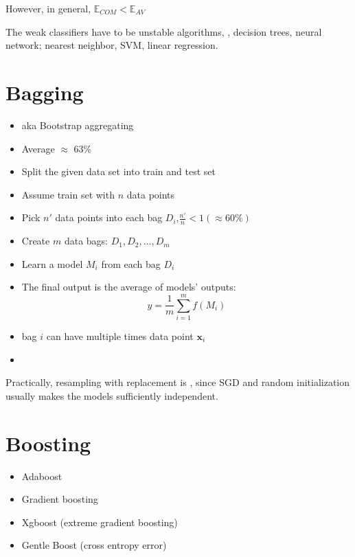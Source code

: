 However, in general, $\mathbb{E}_{COM} < \mathbb{E}_{AV}$

\note The weak classifiers have to be unstable algorithms, \ie, decision trees, neural network;  nearest neighbor, \ac{SVM}, linear regression.

\section{Bagging}
\label{sec:bagging}
\begin{itemize}
	\item \ac{aka} Bootstrap aggregating
	\item Average $\approx$ 63\%
\end{itemize}

\begin{itemize}
	\item Split the given data set into train and test set
	\item Assume train set with $n$ data points
	\item Pick $n'$ data points into each bag $D_i$,\quad $\frac{n'}{n} < 1 (\approx 60\%)$
	\item Create $m$ data bags: $D_1, D_2, \dots, D_m$
	\item Learn a model $M_i$ from each bag $D_i$
	\item The final output is the average of models' outputs:
	\[y = \frac{1}{m} \sum_{i=1}^{m} f(M_i)\]
	\item {} bag $i$ can have multiple times data point $\textbf{x}_i$
	\item {}
\end{itemize}
\note Practically, resampling with replacement is , since \ac{SGD} and random initialization usually makes the models sufficiently independent.

\section{Boosting}
\begin{itemize}
	\item Adaboost
	\item Gradient boosting
	\item Xgboost (extreme gradient boosting)
	\item Gentle Boost (cross entropy error)
\end{itemize}

